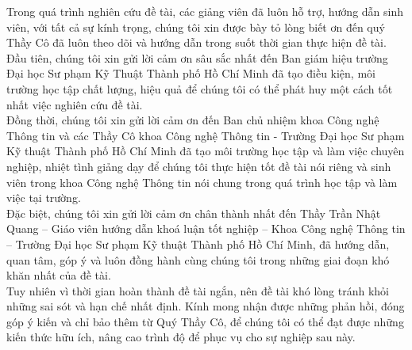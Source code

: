 \thispagestyle{fancy}
Trong quá trình nghiên cứu đề tài, các giảng viên đã luôn hỗ trợ, hướng dẫn sinh viên, với tất cả sự kính trọng, chúng tôi xin được bày tỏ lòng biết ơn đến quý Thầy Cô đã luôn theo dõi và hướng dẫn trong suốt thời gian thực hiện đề tài.\\
Đầu tiên, chúng tôi xin gửi lời cảm ơn sâu sắc nhất đến Ban giám hiệu trường Đại học Sư phạm Kỹ Thuật Thành phố Hồ Chí Minh đã tạo điều kiện, môi trường học tập chất lượng, hiệu quả để chúng tôi có thể phát huy một cách tốt nhất việc nghiên cứu đề tài.\\
Đồng thời, chúng tôi xin gửi lời cảm ơn đến Ban chủ nhiệm khoa Công nghệ Thông tin và các Thầy Cô khoa Công nghệ Thông tin - Trường Đại học Sư phạm Kỹ thuật Thành phố Hồ Chí Minh đã tạo môi trường học tập và làm việc chuyên nghiệp, nhiệt tình giảng dạy để chúng tôi thực hiện tốt đề tài nói riêng và sinh viên trong khoa Công nghệ Thông tin nói chung trong quá trình học tập và làm việc tại trường.\\
Đặc biệt, chúng tôi xin gửi lời cảm ơn chân thành nhất đến Thầy Trần Nhật Quang – Giáo viên hướng dẫn khoá luận tốt nghiệp – Khoa Công nghệ Thông tin – Trường Đại học Sư phạm Kỹ thuật Thành phố Hồ Chí Minh, đã hướng dẫn, quan tâm, góp ý và luôn đồng hành cùng chúng tôi trong những giai đoạn khó khăn nhất của đề tài.\\
Tuy nhiên vì thời gian hoàn thành đề tài ngắn, nên đề tài khó lòng tránh khỏi những sai sót và hạn chế nhất định. Kính mong nhận được những phản hồi, đóng góp ý kiến và chỉ bảo thêm từ Quý Thầy Cô, để chúng tôi có thể đạt được những kiến thức hữu ích, nâng cao trình độ để phục vụ cho sự nghiệp sau này.
